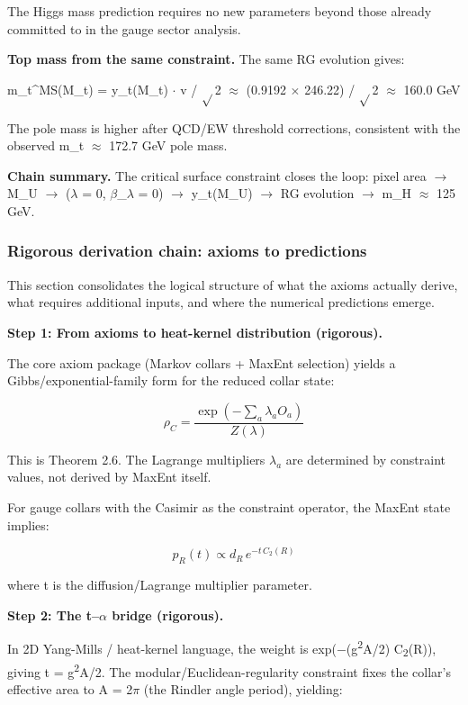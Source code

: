 \documentclass[11pt,a4paper]{article}
\theoremstyle{remark}
\begin{document}
The Higgs mass prediction requires no new parameters beyond those already committed to in the gauge sector analysis.

\textbf{Top mass from the same constraint.} The same RG evolution gives:

m\_t\^{}MS(M\_t) = y\_t(M\_t) \ensuremath{\cdot} v / \ensuremath{\sqrt{}}2 \ensuremath{\approx} (0.9192 \ensuremath{\times} 246.22) / \ensuremath{\sqrt{}}2 \ensuremath{\approx} 160.0 GeV

The pole mass is higher after QCD/EW threshold corrections, consistent with the observed m\_t \ensuremath{\approx} 172.7 GeV pole mass.

\textbf{Chain summary.} The critical surface constraint closes the loop: pixel area \ensuremath{\to} M\_U \ensuremath{\to} (\ensuremath{\lambda} = 0, \ensuremath{\beta}\_\ensuremath{\lambda} = 0) \ensuremath{\to} y\_t(M\_U) \ensuremath{\to} RG evolution \ensuremath{\to} m\_H \ensuremath{\approx} 125 GeV.

\subsubsection{Rigorous derivation chain: axioms to predictions}\label{rigorous-derivation-chain-axioms-to-predictions}

This section consolidates the logical structure of what the axioms actually derive, what requires additional inputs, and where the numerical predictions emerge.

\textbf{Step 1: From axioms to heat-kernel distribution (rigorous).}

The core axiom package (Markov collars + MaxEnt selection) yields a Gibbs/exponential-family form for the reduced collar state:

\[
\rho_C = \frac{\exp(-\sum_a \lambda_a O_a)}{Z(\lambda)}
\]

This is Theorem 2.6. The Lagrange multipliers $\lambda_a$ are determined by constraint values, not derived by MaxEnt itself.

For gauge collars with the Casimir as the constraint operator, the MaxEnt state implies:

\[
p_R(t) \propto d_R \, e^{-t \, C_2(R)}
\]

where t is the diffusion/Lagrange multiplier parameter.

\textbf{Step 2: The t--\ensuremath{\alpha} bridge (rigorous).}

In 2D Yang-Mills / heat-kernel language, the weight is exp(\ensuremath{-}(g\textsuperscript{2}A/2) C\textsubscript{2}(R)), giving t = g\textsuperscript{2}A/2. The modular/Euclidean-regularity constraint fixes the collar's effective area to A = 2\ensuremath{\pi} (the Rindler angle period), yielding:
\end{document}
